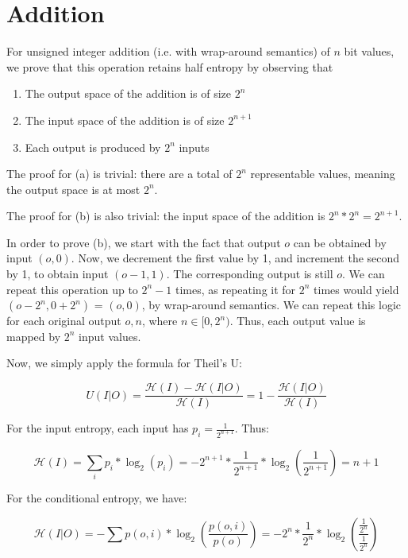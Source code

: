 \documentclass[a4paper]{article}
\newcommand{\entropy}[1]{\mathcal{H}(#1)}
\newcommand{\fnin}[2]{\((#1, #2)\)}
\begin{document}
\section{Addition}

For unsigned integer addition (i.e. with wrap-around semantics) of \(n\) bit
values, we prove that this operation retains half entropy by observing that
\begin{enumerate}[label=\alph*)]
    \item The output space of the addition is of size \(2^n\)
    \item The input space of the addition is of size \(2^{n+1}\)
    \item Each output is produced by \(2^{n}\) inputs
\end{enumerate}

The proof for (a) is trivial: there are a total of \(2^n\) representable
values, meaning the output space is at most \(2^n\).

The proof for (b) is also trivial: the input space of the addition is \(2^n *
2^n = 2^{n+1}\).

In order to prove (b), we start with the fact that output \(o\) can be obtained
by input \fnin{o}{0}. Now, we decrement the first value by 1, and increment the
second by 1, to obtain input \fnin{o - 1}{1}. The corresponding output is still
\(o\). We can repeat this operation up to \(2^n - 1\) times, as repeating it
for \(2^n\) times would yield \fnin{o - 2^n}{0 + 2^n} = \fnin{o}{0}, by
wrap-around semantics. We can repeat this logic for each original output \(o,
n\), where \(n \in [0, 2^n)\). Thus, each output value is mapped by \(2^n\)
input values.

Now, we simply apply the formula for Theil's U:

\begin{equation}
    U(I|O) = \frac{\entropy{I} - \entropy{I|O}}{\entropy{I}} = 1 - \frac{\entropy{I|O}}{\entropy{I}}
\end{equation}

For the input entropy, each input has \(p_i = \frac{1}{2^{n+1}}\). Thus:

\begin{equation*}
    \entropy{I} = \sum_{i} p_i * \log_2(p_i) = - 2^{n+1} * \frac{1}{2^{n+1}} * \log_2 (\frac{1}{2^{n+1}}) = n+1
\end{equation*}

For the conditional entropy, we have:

\begin{equation*}
    \entropy{I|O} = - \sum p(o, i) * \log_2 (\frac{p(o, i)}{p(o)}) = - 2^n * \frac{1}{2^n} * \log_2 ( \frac{\frac{1}{2^n}}{\frac{1}{2^n}} )
\end{equation*}
\end{document}
